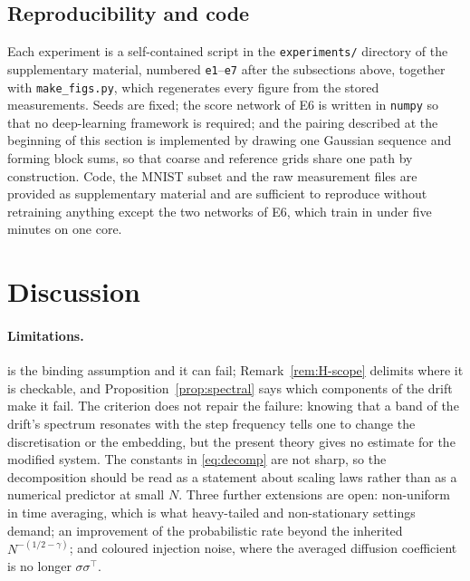 \documentclass[a4paper,fleqn]{cas-dc}
\theoremstyle{definition}
\begin{document}


\subsection{Reproducibility and code}
\label{sec:repro}

Each experiment is a self-contained script in the \texttt{experiments/} directory of
the supplementary material, numbered \texttt{e1}--\texttt{e7} after the subsections
above, together with \texttt{make\_figs.py}, which regenerates every figure from the
stored measurements. Seeds
are fixed; the score network of E6 is written in \texttt{numpy} so that no
deep-learning framework is required; and the pairing described at the beginning of this
section is implemented by drawing one Gaussian sequence and forming block sums, so that
coarse and reference grids share one path by construction. Code, the MNIST subset and
the raw measurement files are provided as supplementary material and are sufficient to
reproduce  without retraining anything
except the two networks of E6, which train in under five minutes on one core.

\section{Discussion}
\label{sec:discussion}

\paragraph{Limitations.}
 is the binding assumption and it can fail; Remark~\ref{rem:H-scope} delimits
where it is checkable, and Proposition~\ref{prop:spectral} says which components of the drift make
it fail. The criterion does not repair the failure: knowing that a band of
the drift's spectrum resonates with the step frequency tells one to change the
discretisation or the embedding, but the present theory gives no estimate for the
modified system. The constants in \eqref{eq:decomp} are not sharp, so the decomposition
should be read as a statement about scaling laws rather than as a numerical predictor at
small $N$. Three further extensions are open: non-uniform in time averaging, which is
what heavy-tailed and non-stationary settings demand; an improvement of the probabilistic
rate beyond the inherited $N^{-(1/2-\gamma)}$; and coloured injection noise, where the
averaged diffusion coefficient is no longer $\sigma\sigma^{\top}$.
\end{document}
